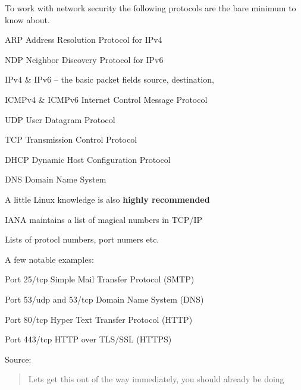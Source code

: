 \documentclass[Screen16to9,17pt]{foils}
\begin{document}





To work with network security the following protocols are the bare minimum to know about.

\begin{list2}
\item ARP Address Resolution Protocol for IPv4
\item NDP Neighbor Discovery Protocol for IPv6
\item IPv4 \& IPv6 -- the basic packet fields source, destination,
\item ICMPv4 \& ICMPv6 Internet Control Message Protocol
\item UDP User Datagram Protocol
\item TCP Transmission Control Protocol
\item DHCP Dynamic Host Configuration Protocol
\item DNS Domain Name System
\end{list2}

\centerline{A little Linux knowledge is also {\bf highly recommended}}




\begin{list1}
\item IANA maintains a list of magical numbers in TCP/IP
\item Lists of protocl numbers, port numers etc.
\item A few notable examples:
\begin{list2}
\item Port 25/tcp Simple Mail Transfer Protocol (SMTP)
\item Port 53/udp and 53/tcp Domain Name System (DNS)
\item Port 80/tcp Hyper Text Transfer Protocol (HTTP)
\item Port 443/tcp HTTP over TLS/SSL (HTTPS)
\end{list2}
\item Source: 
\end{list1}



\begin{quote}
Lets get this out of the way immediately, you should already be doing
\end{quote}
\end{document}
